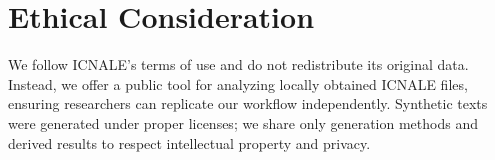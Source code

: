 \section*{Ethical Consideration}
We follow ICNALE’s terms of use and do not redistribute its original data. Instead, we offer a public tool for analyzing locally obtained ICNALE files, ensuring researchers can replicate our workflow independently. Synthetic texts were generated under proper licenses; we share only generation methods and derived results to respect intellectual property and privacy.